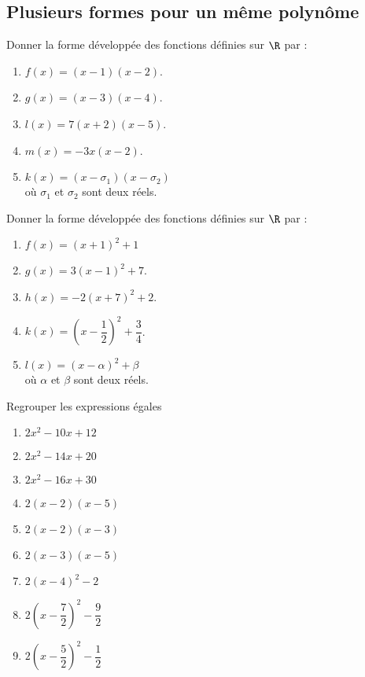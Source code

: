 \documentclass[a4paper,11pt,exos]{nsi} %
\begin{document}
\maketitle

\subsection*{Plusieurs formes pour un même polynôme}

\exo{}
Donner la forme développée des fonctions définies sur $\R$ par :
\begin{multicols}{3}
	\begin{enumerate}[label=\textbullet]
		\item 	$f(x)=(x-1)(x-2)$.
		\item 	$g(x)=(x-3)(x-4)$.
		\item	$l(x)=7(x+2)(x-5)$.
		\item 	$m(x)=-3x(x-2)$.
		\item 	$k(x)=(x-\sigma_1)(x-\sigma_2)$ \\où $\sigma_1$ et $\sigma_2$ sont deux réels.\columnbreak
	\end{enumerate}
\end{multicols}


\exo{}
Donner la forme développée des fonctions définies sur $\R$ par :
\begin{multicols}{3}
	\begin{enumerate}[label=\textbullet]
		\item 	$f(x)=(x+1)^2+1$
		\item 	$g(x)=3(x-1)^2+7$.
		\item 	$h(x)=-2(x+7)^2+2$.
		\item 	$k(x)=\left(x-\dfrac{1}{2}\right)^2+\dfrac{3}{4}$.
		\item	$l(x)=(x-\alpha)^2+\beta$\\ où $\alpha$ et $\beta$ sont deux réels.
	\end{enumerate}
\end{multicols}


\exo{}
Regrouper les expressions égales
\begin{multicols}{3}
	\begin{enumerate}[label=\textbullet]
		\item 	$2x^2-10x+12$
		\item 	$2x^2-14x+20$
		\item 	$2x^2-16x+30$
	\columnbreak
		\item 	$2(x-2)(x-5)$
		\item 	$2(x-2)(x-3)$
		\item 	$2(x-3)(x-5)$
	\columnbreak
		\item	$2\left(x-4\right)^2-2$
		\item	$2\left(x-\dfrac{7}{2}\right)^2-\dfrac{9}{2}$
		\item 	$2\left(x-\dfrac{5}{2}\right)^2-\dfrac{1}{2}$
		
	\end{enumerate}
\end{multicols}
\end{document}
